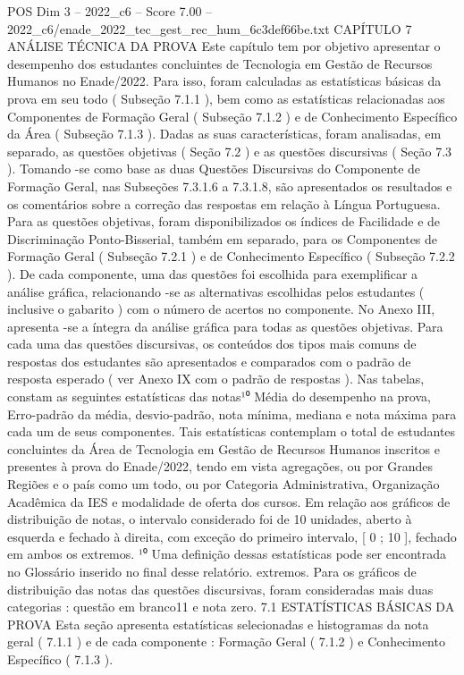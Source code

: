 \begin{textsample}{POS Dim 3 – 2022\_c6 – Score 7.00 – 2022\_c6/enade\_2022\_tec\_gest\_rec\_hum\_6c3def66be.txt}  \label{ex:f3_pos_023}
CAPÍTULO 7 ANÁLISE TÉCNICA DA PROVA Este capítulo tem por objetivo apresentar o desempenho dos estudantes concluintes de Tecnologia em Gestão de Recursos Humanos no Enade/2022.
Para isso, foram calculadas as estatísticas básicas da prova em seu todo ( Subseção 7.1.1 ), bem como as estatísticas relacionadas aos Componentes de Formação Geral ( Subseção 7.1.2 ) e de Conhecimento Específico da Área ( Subseção 7.1.3 ).
Dadas as suas características, foram analisadas, em separado, as questões objetivas ( Seção 7.2 ) e as questões discursivas ( Seção 7.3 ).
Tomando -se como base as duas Questões Discursivas do Componente de Formação Geral, nas Subseções 7.3.1.6 a 7.3.1.8, são apresentados os resultados e os comentários sobre a correção das respostas em relação à Língua Portuguesa.
Para as questões objetivas, foram disponibilizados os índices de Facilidade e de Discriminação Ponto-Bisserial, também em separado, para os Componentes de Formação Geral ( Subseção 7.2.1 ) e de Conhecimento Específico ( Subseção 7.2.2 ).
De cada componente, uma das questões foi escolhida para exemplificar a análise gráfica, relacionando -se as alternativas escolhidas pelos estudantes ( inclusive o gabarito ) com o número de acertos no componente.
No Anexo III, apresenta -se a íntegra da análise gráfica para todas as questões objetivas.
Para cada uma das questões discursivas, os conteúdos dos tipos mais comuns de respostas dos estudantes são apresentados e comparados com o padrão de resposta esperado ( ver Anexo IX com o padrão de respostas ).
Nas tabelas, constam as seguintes estatísticas das notas¹⁰ Média do desempenho na prova, Erro-padrão da média, desvio-padrão, nota mínima, mediana e nota máxima para cada um de seus componentes.
Tais estatísticas contemplam o total de estudantes concluintes da Área de Tecnologia em Gestão de Recursos Humanos inscritos e presentes à prova do Enade/2022, tendo em vista agregações, ou por Grandes Regiões e o país como um todo, ou por Categoria Administrativa, Organização Acadêmica da IES e modalidade de oferta dos cursos.
Em relação aos gráficos de distribuição de notas, o intervalo considerado foi de 10 unidades, aberto à esquerda e fechado à direita, com exceção do primeiro intervalo, [ 0 ; 10 ], fechado em ambos os extremos. ¹⁰ Uma definição dessas estatísticas pode ser encontrada no Glossário inserido no final desse relatório. extremos.
Para os gráficos de distribuição das notas das questões discursivas, foram consideradas mais duas categorias : questão em branco11 e nota zero. 7.1 ESTATÍSTICAS BÁSICAS DA PROVA Esta seção apresenta estatísticas selecionadas e histogramas da nota geral ( 7.1.1 ) e de cada componente : Formação Geral ( 7.1.2 ) e Conhecimento Específico ( 7.1.3 ).

\end{textsample}

